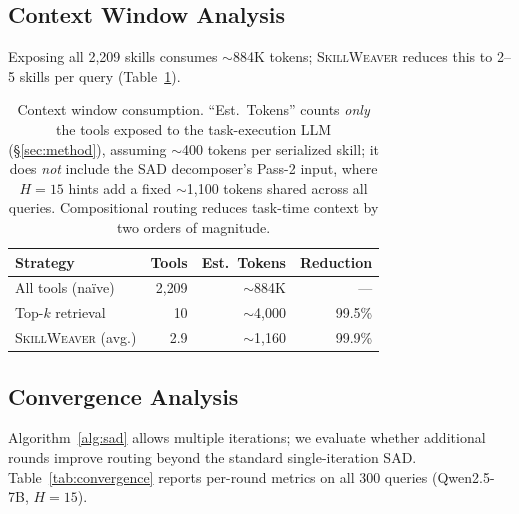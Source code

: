 \documentclass[11pt]{article}
\newcommand{\system}{\textsc{SkillWeaver}}
\begin{document}
\subsection{Context Window Analysis}
\label{sec:context}

Exposing all 2{,}209 skills consumes $\sim$884K tokens; \system{} reduces this to 2--5 skills per query (Table~\ref{tab:context}).

\begin{table}[t]
\centering
\small
\begin{tabular}{@{}lrrr@{}}
\toprule
\textbf{Strategy} & \textbf{Tools} & \textbf{Est.\ Tokens} & \textbf{Reduction} \\
\midrule
All tools (na\"ive) & 2{,}209 & $\sim$884K & --- \\
Top-$k$ retrieval & 10 & $\sim$4{,}000 & 99.5\% \\
\system{} (avg.) & 2.9 & $\sim$1{,}160 & 99.9\% \\
\bottomrule
\end{tabular}
\caption{Context window consumption. ``Est.\ Tokens'' counts \emph{only} the tools exposed to the task-execution LLM (\S\ref{sec:method}), assuming $\sim$400 tokens per serialized skill; it does \emph{not} include the SAD decomposer's Pass-2 input, where $H{=}15$ hints add a fixed $\sim$1{,}100 tokens shared across all queries. Compositional routing reduces task-time context by two orders of magnitude.}
\label{tab:context}
\end{table}

\subsection{Convergence Analysis}
\label{sec:convergence}

Algorithm~\ref{alg:sad} allows multiple iterations; we evaluate whether additional rounds improve routing beyond the standard single-iteration SAD.
Table~\ref{tab:convergence} reports per-round metrics on all 300 queries (Qwen2.5-7B, $H{=}15$).
\end{document}
